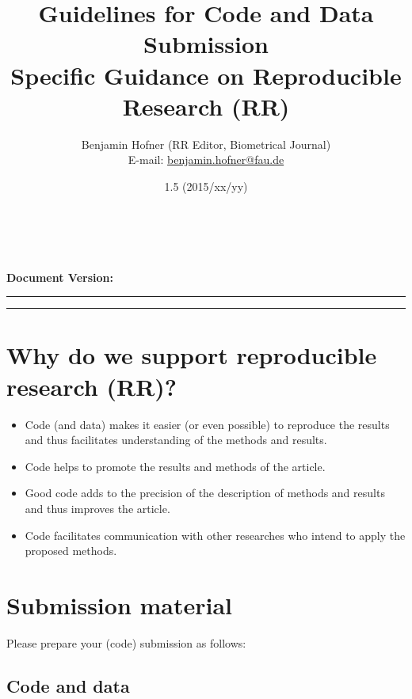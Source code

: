 \documentclass[12pt,a4paper]{article}
\title{\LARGE Guidelines for Code and Data Submission\\[0.2em]
  \large Specific Guidance on Reproducible Research (RR)}
\author{Benjamin Hofner (RR Editor, Biometrical Journal)\\
  E-mail: \href{mailto:benjamin.hofner@fau.de}{benjamin.hofner@fau.de}}
\date{1.5 (2015/xx/yy)}
\makeatletter
\renewcommand{\maketitle}{\bgroup\setlength{\parindent}{0pt}
  \begin{flushleft}
    \vspace*{2cm}
    \textbf{\Large \@title}\\[1em]

    \@author\\[0.5em]

    \textbf{Document Version:} \@date
    \vspace{2em}
  \end{flushleft}\egroup
}
\makeatother
\begin{document}
\maketitle

\hrule

\tableofcontents

\vspace{2em}
\hrule
\vspace{0.5cm}

\setlength{\parskip}{0.2em}

\section*{Why do we support reproducible research (RR)?}
\begin{itemize}
\item Code (and data) makes it easier (or even possible) to reproduce the results
  and thus facilitates understanding of the methods and results.
\item Code helps to promote the results and methods of the article.
\item Good code adds to the precision of the description of methods and results
  and thus improves the article.
\item Code facilitates communication with other researches who intend to apply
  the proposed methods.
\end{itemize}

\newpage
\setcounter{section}{0}

\section{Submission material}

Please prepare your (code) submission as follows:

\subsection{Code and data}
\end{document}
